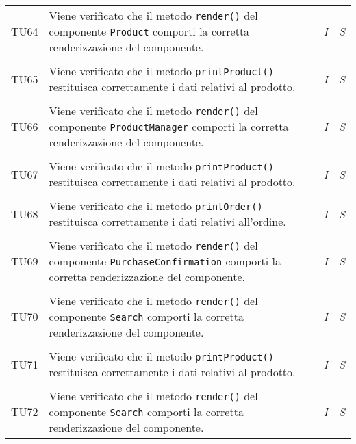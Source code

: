 \begin{longtable}{ >{\centering}p{} >{}p{}
				>{\centering}p{} >{\centering}p{}}
			\tabularnewline
			\hypertarget{TU64}{TU64} & Viene verificato che il metodo 
			\texttt{render()} del componente \texttt{Product} comporti la 
			corretta renderizzazione del componente. & 
			\textit{I} & 
			\textit{S}\\        
						     
			\tabularnewline
			\hypertarget{TU65}{TU65} & Viene verificato che il metodo 
			\texttt{printProduct()} restituisca correttamente i dati 
			relativi al prodotto. & 
			\textit{I} & 
			\textit{S}\\        
						     
			\tabularnewline
			\hypertarget{TU66}{TU66} & Viene verificato che il metodo 
			\texttt{render()} del componente \texttt{ProductManager} 
			comporti la corretta renderizzazione del componente. & 
			\textit{I} & 
			\textit{S}\\        
						     
			\tabularnewline
			\hypertarget{TU67}{TU67} & Viene verificato che il metodo 
			\texttt{printProduct()} restituisca correttamente i dati 
			relativi al prodotto. & 
			\textit{I} & 
			\textit{S}\\        
						     
			\tabularnewline
			\hypertarget{TU68}{TU68} & Viene verificato che il metodo 
			\texttt{printOrder()} restituisca correttamente i dati relativi 
			all'ordine. & 
			\textit{I} & 
			\textit{S}\\        
			
			\tabularnewline
			\hypertarget{TU69}{TU69} & Viene verificato che il metodo 
			\texttt{render()} del componente \texttt{PurchaseConfirmation} 
			comporti la corretta renderizzazione del componente. & 
			\textit{I} & 
			\textit{S}\\
						
			\tabularnewline
			\hypertarget{TU70}{TU70} & Viene verificato che il metodo 
			\texttt{render()} del componente \texttt{Search} comporti 
			la corretta renderizzazione del componente. & 
			\textit{I} & 
			\textit{S}\\
						
			\tabularnewline
			\hypertarget{TU71}{TU71} & Viene verificato che il metodo 
			\texttt{printProduct()} restituisca correttamente i dati 
			relativi al prodotto. & 
			\textit{I} & 
			\textit{S}\\
						
			\tabularnewline
			\hypertarget{TU72}{TU72} & Viene verificato che il metodo 
			\texttt{render()} del componente \texttt{Search} comporti 
			la corretta renderizzazione del componente. & 
			\textit{I} & 
			\textit{S}\\
						

\end{longtable}
